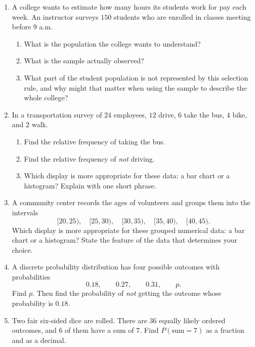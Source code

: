 \documentclass[11pt]{article}
\newcommand{\workmed}{\par\vspace{0.62in}}
\newcommand{\worklarge}{\par\vspace{0.92in}}
\newcommand{\workxl}{\par\vspace{1.22in}}
\begin{document}
\begin{enumerate}
\item A college wants to estimate how many hours its students work for pay each week. An instructor surveys \(150\) students who are enrolled in classes meeting before \(9\) a.m.
\begin{enumerate}[label=(\alph*),itemsep=4pt]
\item What is the population the college wants to understand?
\item What is the sample actually observed?
\item What part of the student population is not represented by this selection rule, and why might that matter when using the sample to describe the whole college?
\end{enumerate}
\workxl

\item In a transportation survey of \(24\) employees, \(12\) drive, \(6\) take the bus, \(4\) bike, and \(2\) walk.
\begin{enumerate}[label=(\alph*),itemsep=4pt]
\item Find the relative frequency of taking the bus.
\item Find the relative frequency of \emph{not} driving.
\item Which display is more appropriate for these data: a bar chart or a histogram? Explain with one short phrase.
\end{enumerate}
\worklarge

\item A community center records the ages of volunteers and groups them into the intervals
\[
[20,25),\quad [25,30),\quad [30,35),\quad [35,40),\quad [40,45).
\]
Which display is more appropriate for these grouped numerical data: a bar chart or a histogram? State the feature of the data that determines your choice.
\workmed

\item A discrete probability distribution has four possible outcomes with probabilities
\[
0.18,\qquad 0.27,\qquad 0.31,\qquad p.
\]
Find \(p\). Then find the probability of \emph{not} getting the outcome whose probability is \(0.18\).
\worklarge

\item Two fair six-sided dice are rolled. There are \(36\) equally likely ordered outcomes, and \(6\) of them have a sum of \(7\). Find \(P(\text{sum}=7)\) as a fraction and as a decimal.
\workmed
\end{enumerate}
\end{document}
